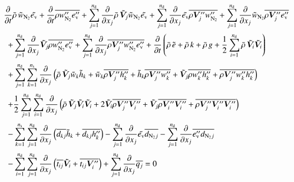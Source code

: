 \documentclass{warpdoc}
\newcommand{\alb}{\vspace{0.2cm}\\} %
\newcommand{\nd}{{{n}_{\rm d}}}
\newcommand{\ns}{{{n}_{\rm s}}}
\newcommand{\mfd}{\displaystyle}
\newcommand{\ev}{e_{\rm v}}
\newcommand{\cNtwo}{w_{\rm N_2}}
\begin{document}
\begin{displaymath}
 \begin{array}{l}
\mfd    \frac{\partial}{\partial t} \wbar{\rho}\, {\wtilde{w}_{\rm N_2}}   \wtilde{\ev}
+\mfd    \frac{\partial}{\partial t} \overline{\rho \cNtwo^{\prime\prime}   \ev^{\prime\prime}}
+\sum_{j=1}^{\nd} \frac{\partial}{\partial x_j} \wbar{\rho}\, {\wtilde{\bm{V}}_j} {\wtilde{w}_{\rm N_2}} {\wtilde{\ev}}
       +\sum_{j=1}^{\nd} \frac{\partial}{\partial x_j}{\wtilde{\ev}} \overline{\rho \bm{V}_j^{\prime\prime} \cNtwo^{\prime\prime}}   +\sum_{j=1}^{\nd} \frac{\partial}{\partial x_j}{\wtilde{w}_{\rm N_2}} \overline{\rho \bm{V}_j^{\prime\prime} \ev^{\prime\prime}}\alb\mfd
%
~~    
       +\sum_{j=1}^{\nd} \frac{\partial}{\partial x_j}{\wtilde{\bm{V}}_j} \overline{\rho \cNtwo^{\prime\prime} \ev^{\prime\prime}}
       +\sum_{j=1}^{\nd} \frac{\partial}{\partial x_j}\overline{\rho \bm{V}_j^{\prime\prime} \cNtwo^{\prime\prime} \ev^{\prime\prime}} +\frac{\partial}{\partial t}
       \left( \wbar{\rho}\,  \wtilde{e}
           + \wbar{\rho}\, k
           + \wbar{\rho}\, g
           + \frac{1}{2}\sum_{i=1}^{\nd}
                    \wbar{\rho}\,   {\wtilde{\bm{V}}_i}  {\wtilde{\bm{V}}_i}
       \right)\alb
 ~~   
    \mfd
     + \sum_{j=1}^{\nd} \sum_{k=1}^{\ns} \frac{\partial}{\partial x_j}
       \left(
         \wbar{\rho}\,  {\wtilde{\bm{V}}_j}  {\wtilde{w}_k}  {\wtilde{h}_k}
         + {\wtilde{w}_k}  \overline{\rho  \bm{V}_j^{\prime\prime}  h_k^{\prime\prime}}
         + {\wtilde{h}_k}  \overline{\rho  \bm{V}_j^{\prime\prime}  w_k^{\prime\prime}}
         + {\wtilde{\bm{V}}_j}  \overline{\rho  w_k^{\prime\prime}  h_k^{\prime\prime}}
         + \overline{\rho  \bm{V}_j^{\prime\prime}  w_k^{\prime\prime}  h_k^{\prime\prime} }
       \right)\alb\mfd~~
     + \frac{1}{2}\sum_{j=1}^{\nd} \sum_{i=1}^{\nd} \frac{\partial}{\partial x_j}
       \left(
         \wbar{\rho}\,  {\wtilde{\bm{V}}_j}  {\wtilde{\bm{V}}_i}  {\wtilde{\bm{V}}_i}
         + 2 {\wtilde{\bm{V}}_i}  \overline{\rho  \bm{V}_j^{\prime\prime}  \bm{V}_i^{\prime\prime}}
         + {\wtilde{\bm{V}}_j}  \overline{\rho  \bm{V}_i^{\prime\prime}  \bm{V}_i^{\prime\prime}}
         + \overline{\rho  \bm{V}_j^{\prime\prime}  \bm{V}_i^{\prime\prime}  \bm{V}_i^{\prime\prime} }
       \right)\alb
   ~~ \mfd - \sum_{k=1}^{\ns}\sum_{j=1}^{\nd} \frac{\partial }{\partial x_j} \left( \overline{ d_{kj} }  {\wtilde{h}_k}+\overline{ d_{kj}  h_k^{\prime\prime}} \right)
   - \sum_{j=1}^{\nd} \frac{\partial }{\partial x_j} \wtilde{\ev} \overline{d_{{\rm N_2}j} }- \sum_{j=1}^{\nd} \frac{\partial }{\partial x_j} \overline{\ev^{\prime\prime} d_{{\rm N_2}j} }\alb\mfd
~~         - \sum_{i=1}^{\nd}\sum_{j=1}^{\nd} \frac{\partial }{\partial x_j} \left( \overline{ t_{ij} }  {\wtilde{\bm{V}}_i} + \overline{ t_{ij}  \bm{V}_i^{\prime\prime} }\right)
         + \sum_{j=1}^{\nd} \frac{\partial }{\partial x_j} \overline{q_j}= 0
\end{array}
\end{displaymath}
\end{document}
